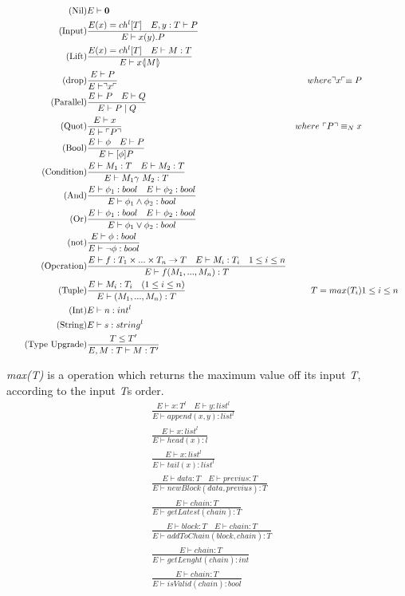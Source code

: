 \begin{align}
\tag{Nil} &E \vdash \mathbf{0}\\
\tag{Input} &\frac{E(x) = ch^l[T]\quad E,y:T\vdash P}{E \vdash x(y).P}\\
\tag{Lift} &\frac{E(x) = ch^l[T] \quad E \vdash M:T}{E\vdash x \langle \! | M | \! \rangle}\\
\tag{drop} &\frac{E \vdash P}{E\vdash \urcorner x \ulcorner}& where \urcorner x \ulcorner \equiv P\\
\tag{Parallel} &\frac{E\vdash P \quad E \vdash Q}{E \vdash P \mid Q}\\
\tag{Quot} &\frac{E \vdash x}{E\vdash \ulcorner P \urcorner}& where\ \ulcorner P \urcorner \equiv_N x\\
\tag{Bool} &\frac{E\vdash \phi \quad E\vdash P}{E \vdash [\phi] P}\\
\tag{Condition} &\frac{E\vdash M_1:T \quad E\vdash M_2:T}{E\vdash M_1 \gamma\ M_2:T}\\
\tag{And} &\frac{E\vdash \phi _1:bool \quad E\vdash \phi _2:bool}{E\vdash \phi _1 \land \phi _2:bool}\\
\tag{Or} &\frac{E\vdash \phi _1:bool \quad E\vdash \phi _2:bool}{E\vdash \phi _1 \lor \phi _2:bool}\\
\tag{not} &\frac{E\vdash \phi :bool }{E\vdash \neg \phi :bool}\\
\tag{Operation} &\frac{E\vdash f:T_1\times ... \times T_n\rightarrow T\quad E\vdash M_i:T_i\quad 1\leq i \leq n}{E\vdash f(M_1,...,M_n):T}\\
\tag{Tuple} &\frac{E\vdash M_i:T_i \quad (1\leq i\leq n)}{E\vdash (M_1,...,M_n):T}&T = max(T_i)& 1\leq i\leq n\\
\tag{Int} &E\vdash n: int^l\\
\tag{String} &E\vdash s:string^l\\
\tag{Type Upgrade} &\frac{T\leq T'}{E, M:T\vdash M:T'}
\end{align}


\textit{max(T)} is a operation which returns the maximum value off its input \textit{T}, according to the input \textit{T}s order.
\begin{align}
\tag{Append} &\frac{E \vdash x:T^l \quad E \vdash y:list^l}{E \vdash append(x,y):list^l}\\
\tag{Head} &\frac{E \vdash x:list^l}{E \vdash head(x):l}\\
\tag{Tail} &\frac{E \vdash x:list^l}{E \vdash tail(x):list^l}\\
\tag{newBlock}& \frac{E \vdash data:T \quad E \vdash previus : T}{E \vdash newBlock(data, previus) :T}\\
\tag{getLatest}& \frac{E \vdash chain :T}{E \vdash getLatest(chain):T}\\
\tag{addToChain}& \frac{E \vdash block:T \quad E \vdash chain:T}{E \vdash addToChain(block, chain):T}\\
\tag{getLenght}& \frac{E \vdash chain:T}{E \vdash getLenght(chain):int}\\
\tag{isValid}& \frac{E \vdash chain:T}{E \vdash isValid(chain):bool}
\end{align}


